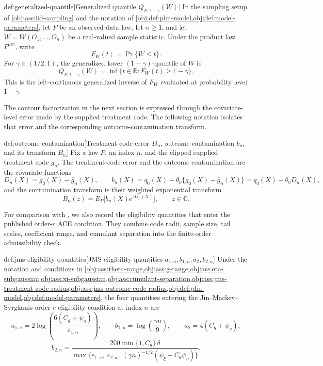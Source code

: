 \begin{definitionv}{def:generalized-quantile}[Generalized quantile \(Q_{P,1-\gamma}(W)\)]
In the sampling setup of \cref{obj:ass:iid-sampling} and the notation of \cref{obj:def:plm-model,obj:def:model-parameters}, let \(P\) be an observed-data law, let \(n\ge 1\), and let \(W=W(O_1,\ldots,O_n)\) be a real-valued sample statistic. Under the product law \(P^{\otimes n}\), write
\[
F_W(t)=\Pr\{W\le t\}.
\]
For \(\gamma\in(1/2,1)\), the generalized lower \((1-\gamma)\)-quantile of \(W\) is
\[
Q_{P,1-\gamma}(W)
=
\inf\{t\in\mathbb R:F_W(t)\ge 1-\gamma\}.
\]
This is the left-continuous generalized inverse of \(F_W\) evaluated at probability level \(1-\gamma\).
\end{definitionv}

The contour factorization in the next section is expressed through the covariate-level error made by the supplied treatment code. The following notation isolates that error and the corresponding outcome-contamination transform.

\begin{definitionv}{def:outcome-contamination}[Treatment-code error \(D_n\), outcome contamination \(b_n\), and its transform \(B_n\)]
Fix a law \(P\), an index \(n\), and the clipped supplied treatment code \(\bar g_n\).  The treatment-code error and the outcome contamination are the covariate functions
\[
 D_n(X)=g_0(X)-\bar g_n(X),
 \qquad
 b_n(X)=q_0(X)-\theta_0\{g_0(X)-\bar g_n(X)\}=q_0(X)-\theta_0 D_n(X),
\]
and the contamination transform is their weighted exponential transform
\[
 B_n(z)=E_P\bigl[b_n(X)e^{zD_n(X)}\bigr],\qquad z\in\mathbb C.
\]
\end{definitionv}

For comparison with \citet{JinMackeySyrgkanis2025}, we also record the eligibility quantities that enter the published order-\(r\) ACE condition. They combine code radii, sample size, tail scales, coefficient range, and cumulant separation into the finite-order admissibility check.

\begin{definitionv}{def:jms-eligibility-quantities}[JMS eligibility quantities \(a_{1,n},b_{1,n},a_2,b_{2,n}\)]
Under the notation and conditions in \cref{obj:ass:theta-range,obj:ass:g-range,obj:ass:eta-subgaussian,obj:ass:xi-subgaussian,obj:ass:cumulant-separation,obj:ass:jms-treatment-code-radius,obj:ass:jms-outcome-code-radius,obj:def:plm-model,obj:def:model-parameters}, the four quantities entering the Jin--Mackey--Syrgkanis order-\(r\) eligibility condition at index \(n\) are
\[
 a_{1,n}=2\log\!\left(\frac{6(C_g+\psi_{\eta})}{\varepsilon_{1,n}}\right),
 \qquad
 b_{1,n}=\log\!\left(\frac{\gamma n}{9}\right),
 \qquad
 a_2=4(C_g+\psi_{\eta}),
\]
\[
 b_{2,n}=
 \frac{200\min\{1,C_{\theta}\}\,\delta}
      {\max\bigl\{\varepsilon_{1,n},\ \varepsilon_{2,n},\ (\gamma n)^{-1/2}(\psi_{\xi}+C_{\theta}\psi_{\eta})\bigr\}} .
\]
\end{definitionv}

